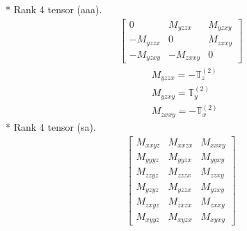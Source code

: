 \documentclass[fleqn,8pt,landscape]{jsarticle}
\begin{document}
* Rank 4 tensor (aaa).
\begin{align*}
\begin{bmatrix} 0 & M_{yzzx} & M_{yzxy} \\ - M_{yzzx} & 0 & M_{zxxy} \\ - M_{yzxy} & - M_{zxxy} & 0 \end{bmatrix}
\end{align*}
\begin{align*}
& M_{yzzx} = - \mathbb{T}_{z}^{(2)} \\
& M_{yzxy} = \mathbb{T}_{y}^{(2)} \\
& M_{zxxy} = - \mathbb{T}_{x}^{(2)}
\end{align*}
* Rank 4 tensor (sa).
\begin{align*}
\begin{bmatrix} M_{xxyz} & M_{xxzx} & M_{xxxy} \\ M_{yyyz} & M_{yyzx} & M_{yyxy} \\ M_{zzyz} & M_{zzzx} & M_{zzxy} \\ M_{yzyz} & M_{yzzx} & M_{yzxy} \\ M_{zxyz} & M_{zxzx} & M_{zxxy} \\ M_{xyyz} & M_{xyzx} & M_{xyxy} \end{bmatrix}
\end{align*}
\end{document}
